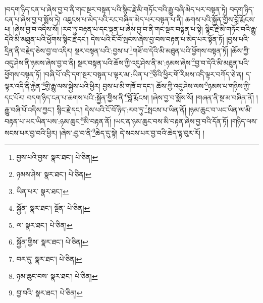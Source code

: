།བདག་ཉིད་ངན་པ་ཞེས་བྱ་བ་ནི་གང་སྔར་བསྟན་པའི་སྙིང་རྗེ་མི་གཏོང་བའི་རྒྱུ་བཞི་མེད་པར་བསྟན་ཏེ། བདག་ཉིད་ངན་པ་ཞེས་བྱ་བ་སྨོས་ཏེ། འཇུངས་པ་མེད་པའི་རང་བཞིན་མེད་པར་བསྟན་པ་ནི། ཆགས་པའི་སྐྱོན་གྱིས་བློ་རྨོངས་པ། །ཞེས་བྱ་བ་འདིས་སོ། །རབ་ཏུ་བརྟན་པ་དང་ལྡན་པ་ཞེས་བྱ་བ་ནི་གང་སྔར་བསྟན་པ་སྟེ། སྙིང་རྗེ་མི་གཏོང་བའི་རྒྱུ་དེའི་མི་མཐུན་པའི་ཕྱོགས་སྙིང་རྗེ་དང་། དེས་པའི་ངོ་བོ་སྤངས་ཞེས་བྱ་བས་བརྟན་པ་མེད་པར་སྟོན་ཏོ། །བྱས་པའི་དྲིན་ནི་བརྗེད་ཅེས་བྱ་བ་འདིར། སྔར་བསྟན་པའི་:བྱས་པ་\footnote{བྱས་པའི་བྱས་  སྣར་ཐང་།  པེ་ཅིན། }གཟོ་བ་དེའི་མི་མཐུན་པའི་ཕྱོགས་བསྟན་ཏོ། །ཆོས་ཀྱི་འདུ་ཤེས་ནི་ཉམས་ཞེས་བྱ་བ་ནི། སྔར་བསྟན་པའི་ཆོས་ཀྱི་འདུ་ཤེས་ནི་མ་:ཉམས་ཞེས་\footnote{ཉམས་ཤེས་  སྣར་ཐང་།  པེ་ཅིན། }བྱ་བ་དེའི་མི་མཐུན་པའི་ཕྱོགས་བསྟན་ཏོ། །བཞི་པོ་འདི་དག་སྔར་བསྟན་པ་ལྟར་མ་:ཡིན་པ་\footnote{ཡིན་པར་  སྣར་ཐང་། }ཅིའི་ཕྱིར་གོ་རིམས་འདི་ལྟར་བཀོད་ཅེ་ན། ད་ལྟར་འདི་ནི་རྐྱེན་\footnote{སྐྱོན་  སྣར་ཐང་། སྔོན་  པེ་ཅིན། }གྱི་རྒྱུ་ལས་སྐྱེས་པའི་ཕྱིར། བྱས་པ་མི་གཟོ་བ་དང་། ཆོས་ཀྱི་འདུ་ཤེས་ལས་\footnote{ལ་  སྣར་ཐང་།  པེ་ཅིན། }ཉམས་པ་གཉིས་ཀྱི་དང་པོར། བདག་ཉིད་ངན་པ་ཆགས་པའི་:སྐྱོན་གྱིས་ནི་\footnote{སྐྱོན་གྱིས་  སྣར་ཐང་།  པེ་ཅིན། }བློ་རྨོངས། །ཞེས་བྱ་བ་སྨོས་སོ། །གཞན་ནི་སྔ་མ་བཞིན་ནོ། །རྒྱུ་བཞི་པོ་འདིས་ཀྱང་། སྙིང་རྗེ་དང་། དེས་པའི་ངོ་བོ་ཉིད་:རབ་ཏུ་\footnote{བར་དུ་  སྣར་ཐང་།  པེ་ཅིན། }སྤངས་པ་ཡིན་ནོ། །ཉམ་ཆུང་བ་ཡང་ཡིན་ལ་མི་བརྟན་པ་ཡང་ཡིན་པས་:ཉམ་ཆུང་\footnote{ཉམ་ཆུང་བས་  སྣར་ཐང་།  པེ་ཅིན། }མི་བརྟན་ནོ། །ཡང་ན་ཉམ་ཆུང་བས་མི་བརྟན་ཞེས་བྱ་བའི་དོན་ཏོ། །གཉིད་ལས་སངས་པར་བྱ་བའི་ཕྱིར། །ཞེས་:བྱ་བ་ནི་\footnote{བྱ་བའི་  སྣར་ཐང་།  པེ་ཅིན། }ཆེད་དུ་སྟེ། དེ་སངས་པར་བྱ་བའི་ཆེད་ལྟ་བུར་རོ། །
